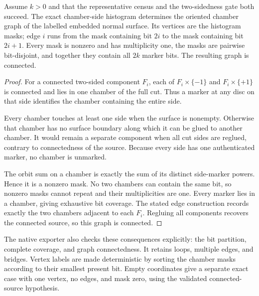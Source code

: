 \begin{theorem}
\label{thm:native-chamber}
Assume $k>0$ and that the representative census and the two-sidedness gate
both succeed.
The exact chamber-side histogram determines the oriented chamber graph of
the labelled embedded normal surface. Its vertices are the histogram masks;
edge $i$ runs from the mask containing bit $2i$ to the mask containing bit
$2i+1$. Every mask is nonzero and has multiplicity one, the masks are
pairwise bit-disjoint, and together they contain all $2k$ marker bits.
The resulting graph is connected.
\end{theorem}
\begin{proof}
For a connected two-sided component $F_i$, each of
$F_i\times\{-1\}$ and $F_i\times\{+1\}$ is connected and lies in one
chamber of the full cut. Thus a marker at any disc on that side identifies
the chamber containing the entire side.

Every chamber touches at least one side when the surface is nonempty.
Otherwise that chamber has no surface boundary along which it can be glued
to another chamber. It would remain a separate component when all cut sides
are reglued, contrary to connectedness of the source. Because every side has
one authenticated marker, no chamber is unmarked.

The orbit sum on a chamber is exactly the sum of its distinct side-marker
powers. Hence it is a nonzero mask. No two chambers can contain the same
bit, so nonzero masks cannot repeat and their multiplicities are one.
Every marker lies in a chamber, giving exhaustive bit coverage. The stated
edge construction records exactly the two chambers adjacent to each $F_i$.
Regluing all components recovers the connected source, so this graph is
connected.
\end{proof}

The native exporter also checks these consequences explicitly: the bit
partition, complete coverage, and graph connectedness. It retains loops,
multiple edges, and bridges. Vertex labels are made deterministic by sorting
the chamber masks according to their smallest present bit. Empty coordinates
give a separate exact case with one vertex, no edges, and mask zero, using
the validated connected-source hypothesis.

